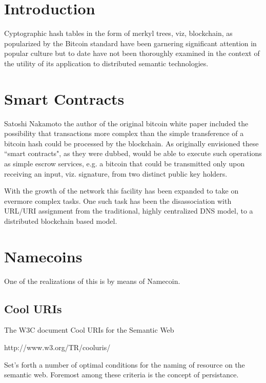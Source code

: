 \documentclass[runningheads,a4paper]{llncs}
\begin{document}
\section{Introduction}

Cyptographic hash tables in the form of merkyl trees, viz, blockchain, as popularized by the Bitcoin standard have been garnering significant attention in popular culture but to date have not been thoroughly examined in the context of the utility of its application to distributed semantic technologies. 





\cite{harthscripting}

\section{Smart Contracts}

Satoshi Nakamoto the author of the original bitcoin white paper included the possibility that transactions more complex than the simple transference of a bitcoin hash could be processed by the blockchain. As originally envisioned these ``smart contracts", as they were dubbed, would be able to execute such operations as simple escrow services, e.g. a bitcoin that could be transmitted only upon receiving an input, viz. signature, from two distinct public key holders.

With the growth of the network this facility has been expanded to take on evermore complex tasks. One such task has been the disassociation with URL/URI assignment from the traditional, highly centralized DNS model, to a distributed blockchain based model. 

\section{Namecoins}

One of the realizations of this is by means of Namecoin. 

\subsection{Cool URIs}

The W3C document Cool URIs for the Semantic Web

http://www.w3.org/TR/cooluris/

Set's forth a number of optimal conditions for the naming of resource on the semantic web. Foremost among these criteria is the concept of persistance. 
\end{document}
